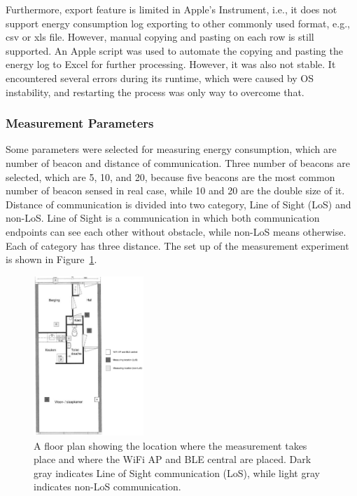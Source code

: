 \documentclass[journal]{vgtc}                %
\begin{document}
Furthermore, export feature is limited in Apple's Instrument, i.e., it does not support energy consumption log exporting to other commonly used format, e.g., csv or xls file. However, manual copying and pasting on each row is still supported. An Apple script was used to automate the copying and pasting the energy log to Excel for further processing. However, it was also not stable. It encountered several errors during its runtime, which were caused by OS instability, and restarting the process was only way to overcome that.

\subsubsection{Measurement Parameters} %
\label{ssub:measurement_parameters}
Some parameters were selected for measuring energy consumption, which are number of beacon and distance of communication. Three number of beacons are selected, which are 5, 10, and 20, because five beacons are the most common number of beacon sensed in real case, while 10 and 20 are the double size of it. Distance of communication is divided into two category, Line of Sight (LoS) and non-LoS. Line of Sight is a communication in which both communication endpoints can see each other without obstacle, while non-LoS means otherwise. Each of category has three distance. The set up of the measurement experiment is shown in Figure~\ref{fig:experiment-map}.

\begin{figure}
  \centering
    \includegraphics[width=0.37\textwidth]{experiment-map}
  \caption{A floor plan showing the location where the measurement takes place  and where the WiFi AP and BLE central are placed. Dark gray indicates Line of Sight communication (LoS), while light gray indicates non-LoS communication.}
  \label{fig:experiment-map}
\end{figure}
\end{document}
